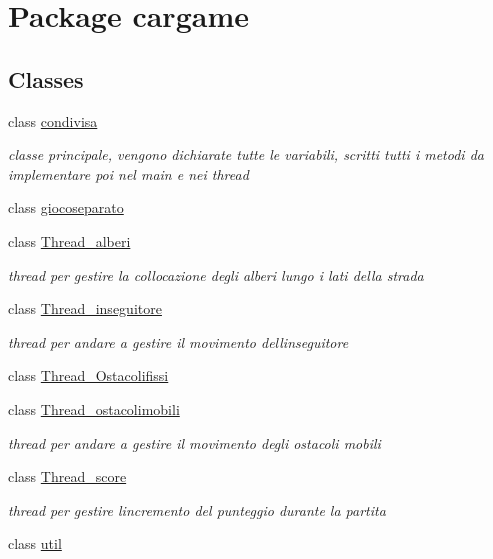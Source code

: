 \hypertarget{namespacecargame}{}\section{Package cargame}
\label{namespacecargame}
\subsection*{Classes}
\begin{DoxyCompactItemize}
\item 
class \hyperlink{classcargame_1_1condivisa}{condivisa}
\begin{DoxyCompactList}\small\item\em classe principale, vengono dichiarate tutte le variabili, scritti tutti i metodi da implementare poi nel main e nei thread \end{DoxyCompactList}\item 
class \hyperlink{classcargame_1_1giocoseparato}{giocoseparato}
\item 
class \hyperlink{classcargame_1_1_thread__alberi}{Thread\+\_\+alberi}
\begin{DoxyCompactList}\small\item\em thread per gestire la collocazione degli alberi lungo i lati della strada \end{DoxyCompactList}\item 
class \hyperlink{classcargame_1_1_thread__inseguitore}{Thread\+\_\+inseguitore}
\begin{DoxyCompactList}\small\item\em thread per andare a gestire il movimento dell\textquotesingle{}inseguitore \end{DoxyCompactList}\item 
class \hyperlink{classcargame_1_1_thread___ostacolifissi}{Thread\+\_\+\+Ostacolifissi}
\item 
class \hyperlink{classcargame_1_1_thread__ostacolimobili}{Thread\+\_\+ostacolimobili}
\begin{DoxyCompactList}\small\item\em thread per andare a gestire il movimento degli ostacoli mobili \end{DoxyCompactList}\item 
class \hyperlink{classcargame_1_1_thread__score}{Thread\+\_\+score}
\begin{DoxyCompactList}\small\item\em thread per gestire l\textquotesingle{}incremento del punteggio durante la partita \end{DoxyCompactList}\item 
class \hyperlink{classcargame_1_1util}{util}
\end{DoxyCompactItemize}
